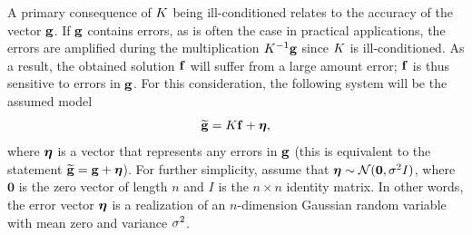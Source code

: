 A primary consequence of $K$ being ill-conditioned relates to the accuracy of the vector $\mathbf{g}$. If $\mathbf{g}$ contains errors, as is often the case in practical applications, the errors are amplified during the multiplication $K^{-1}\mathbf{g}$ since $K$ is ill-conditioned. As a result, the obtained solution $\mathbf{f}$ will suffer from a large amount error; $\mathbf{f}$ is thus sensitive to errors in $\mathbf{g}$. For this consideration, the following system will be the assumed model
\begin{equation}
\widetilde{\mathbf{g}} = K\mathbf{f} + \bm{\eta},
\label{eq:DisNoise}
\end{equation}
where $\bm{\eta}$ is a vector that represents any errors in $\mathbf{g}$ (this is equivalent to the statement $\widetilde{\mathbf{g}} = \mathbf{g} + \bm{\eta}$). For further simplicity, assume that $\bm{\eta} \sim \mathcal{N}(\bm{0},\sigma^2I)$, where $\bm{0}$ is the zero vector of length $n$ and $I$ is the $n \times n$ identity matrix. In other words, the error vector $\bm{\eta}$ is a realization of an $n$-dimension Gaussian random variable with mean zero and variance $\sigma^2$. 

